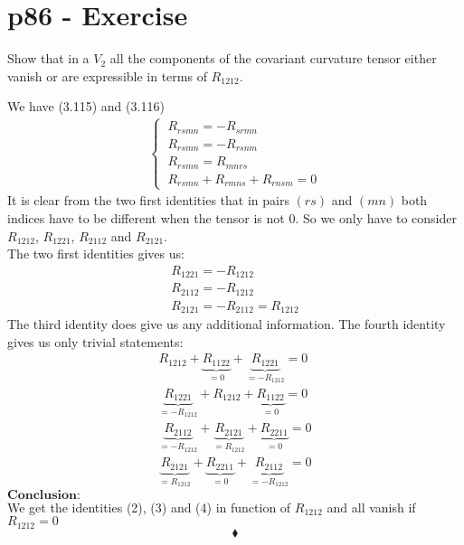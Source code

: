 \section{p86 - Exercise}
\begin{tcolorbox}
Show that in a $V_2$ all the components of the covariant curvature tensor either vanish or are expressible in terms of $R_{1212}$.
\end{tcolorbox}
We have (3.115) and (3.116)
\begin{align}
\left \{ \begin{array}{l}
\ R_{rsmn} =  - R_{srmn}\\
\ R_{rsmn} =  - R_{rsnm}\\
\ R_{rsmn} =   R_{mnrs}\\
\ R_{rsmn} + R_{rmns}+R_{rnsm}=0
\end{array} \right.
\end{align}
It is clear from the two first identities that  in pairs $(rs)$ and $(mn)$ both indices have to be different when the tensor is not $0$. So we only have to consider $R_{1212}$,  $R_{1221}$, $R_{2112}$ and $R_{2121}$.\\
The two first  identities gives us:
\begin{align}
 R_{1221}= -R_{1212}\\
 R_{2112}= -R_{1212}\\
 R_{2121}= -R_{2112} = R_{1212}
\end{align}
The third identity does give us any additional information.
The fourth identity gives us only trivial statements:
\begin{align}
 R_{1212} + \underbrace{R_{1122}}_{=0}+\underbrace{R_{1221}}_{=- R_{1212} } = 0\\
 \underbrace{R_{1221}}_{=- R_{1212}} + R_{1212}+\underbrace{R_{1122}}_{=0 } = 0\\
 \underbrace{R_{2112}}_{=- R_{1212}} + \underbrace{R_{2121}}_{=R_{1212}}+\underbrace{R_{2211}}_{=0} = 0\\
 \underbrace{R_{2121}}_{= R_{1212}} + \underbrace{R_{2211}}_{=0}+\underbrace{R_{2112}}_{= -R_{1212}} = 0
\end{align}
$\textbf{Conclusion:}$\\
We get the identities (2), (3) and (4) in function of $R_{1212}$ and all vanish if $R_{1212} = 0$
$$\blacklozenge$$
\newpage

